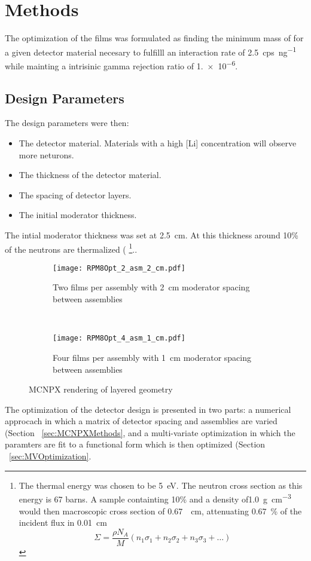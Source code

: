\section{Methods}
\label{sec:Methodes}


The optimization of the films was formulated as finding the minimum mass of  for a given detector material necesary to fulfilll an interaction rate of \SI{2.5}{cps\per\nano\gram{}} while mainting a intrisinic gamma rejection ratio of \num{1.e-6}.

\subsection{Design Parameters}
\label{sec:DesignParameters}
The design parameters were then:
\begin{itemize}
  \item The detector material. Materials with a high [Li] concentration will observe more neturons.
  \item The thickness of the detector material.
  \item The spacing of detector layers.
  \item The initial moderator thickness.
\end{itemize}

The intial moderator thickness was set at \SI{2.5}{\centi \meter}.
At this thickness around 10\% of the neutrons are thermalized (
\footnote{The thermal energy was chosen to be \SI{5}{\electronvolt}. The  neutron cross section as this energy is 67 barns. A sample containting 10\%  and a density of\SI{1.0}{\gram \per \cubic \centi\meter} would then macroscopic cross section of \SI{0.67}{\per \centi\meter}, attenuating \SI{0.67}{\percent} of the incident flux in \SI{0.01}{ \centi\meter}
$$\Sigma = \frac{\rho N_A}{M}  \left ( n_1 \sigma_1 + n_2 \sigma_2 + n_3 \sigma_3 + \dots  \right ) $$}..

\begin{figure}
\end{figure}

\begin{figure}
    \centering
    \begin{subfigure}[b]{0.45\textwidth}
        \texttt{[image: RPM8Opt\_2\_asm\_2\_cm.pdf]}
        \caption{Two films per assembly with \SI{2}{\centi\meter} moderator spacing between assemblies}
    \end{subfigure}%
    ~
    \begin{subfigure}[b]{0.45\textwidth}
        \texttt{[image: RPM8Opt\_4\_asm\_1\_cm.pdf]}
        \caption{Four films per assembly with \SI{1}{\centi\meter} moderator spacing between assemblies}
    \end{subfigure}
    \caption{MCNPX rendering of layered geometry}
    \label{fig:MCNPXRendering}
\end{figure}
The optimization of the detector design is presented in two parts: a numerical approcach in which a matrix of detector spacing and assemblies are varied (Section ~\ref{sec:MCNPXMethods}, and a multi-variate optimization in which the paramters are fit to a functional form which is then optimized (Section ~\ref{sec:MVOptimization}.

